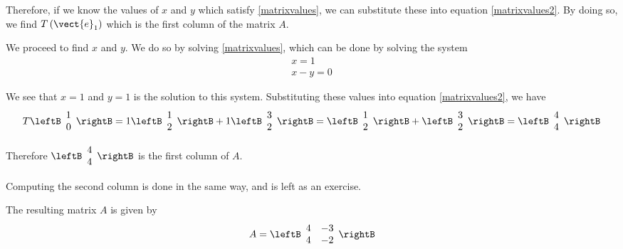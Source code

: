 \begin{solution}
Therefore, if we know the values of $x$ and $y$ which satisfy \ref{matrixvalues}, we can substitute these into equation \ref{matrixvalues2}. By doing so,
we find $T\left(\vect{e}_1\right)$ which is the first column of the matrix $A$. 

We proceed to find $x$ and $y$. We do so by solving \ref{matrixvalues}, which can be done by solving the system
\begin{equation*}
\begin{array}{c}
x = 1 \\
x - y = 0
\end{array}
\end{equation*}

We see that $x=1$ and $y=1$ is the solution to this system. 
Substituting these values into equation \ref{matrixvalues2}, we have 
\begin{equation*}
T\leftB
\begin{array}{r}
1 \\
0 
\end{array}
\rightB = 
 1 \leftB
\begin{array}{r}
1 \\
2
\end{array}
\rightB + 1 \leftB
\begin{array}{r}
3 \\
2
\end{array}
\rightB 
= 
 \leftB
\begin{array}{r}
1 \\
2
\end{array}
\rightB + \leftB
\begin{array}{r}
3 \\
2
\end{array}
\rightB
=
\leftB
\begin{array}{r}
4 \\
4
\end{array}
\rightB
\end{equation*}

Therefore $\leftB
\begin{array}{r}
4 \\
4
\end{array}
\rightB$
is the first column of $A$. 

Computing the second column is done in the same way, and is left as an exercise.

The resulting matrix $A$ is given by 
\begin{equation*}
A
=
\leftB
\begin{array}{rr}
4 & -3 \\
4 & -2
\end{array}
\rightB
\end{equation*}
\end{solution}

